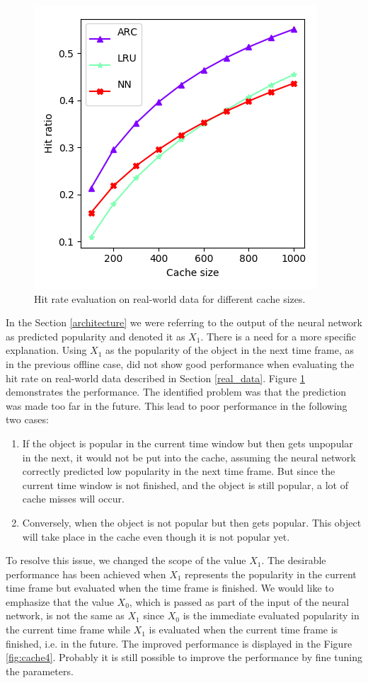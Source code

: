 \begin{figure}[b!]
	\centering
	\captionsetup{justification=centering}
	\includegraphics[width=0.5\linewidth]{pics/cache3.png}
	\caption{Hit rate evaluation on real-world data for different cache sizes.}
	\label{fig:cache3}
\end{figure}

In the Section \ref{architecture} we were referring to the output of the neural network as predicted popularity and denoted it as $X_1$. There is a need for a more specific explanation. Using $X_1$ as the popularity of the object in the next time frame, as in the previous offline case, did not show good performance when evaluating the hit rate on real-world data described in Section \ref{real_data}. Figure \ref{fig:cache3} demonstrates the performance. The identified problem was that the prediction was made too far in the future. This lead to poor performance in the following two cases:

\begin{enumerate}
	\item If the object is popular in the current time window but then gets unpopular in the next, it would not be put into the cache, assuming the neural network correctly predicted low popularity in the next time frame. But since the current time window is not finished, and the object is still popular, a lot of cache misses will occur.
	\item Conversely, when the object is not popular but then gets popular. This object will take place in the cache even though it is not popular yet.
\end{enumerate}

To resolve this issue, we changed the scope of the value $X_1$. The desirable performance has been achieved when $X_1$ represents the popularity in the current time frame but evaluated when the time frame is finished. We would like to emphasize that the value $X_0$, which is passed as part of the input of the neural network, is not the same as $X_1$ since $X_0$ is the immediate evaluated popularity in the current time frame while $X_1$ is evaluated when the current time frame is finished, i.e. in the future. The improved performance is displayed in the Figure \ref{fig:cache4}. Probably it is still possible to improve the performance by fine tuning the parameters. 

